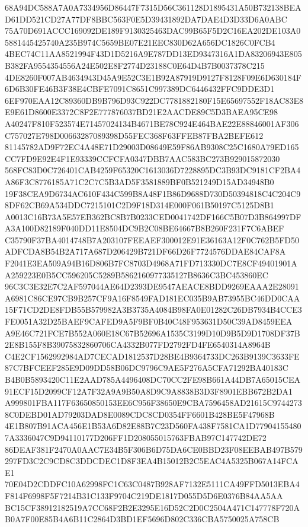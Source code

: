 \documentclass[UTF8,fontset=fandol,zihao=-4,a4paper]{ctexart}
\begin{document}
{{68A94DC588A7A0A7334956D86447F7315D56C361128D1895431A50B732138BEAD61DD521CD27A77DF8BBC563F0E5D39431892DA7DAE4D3D33D6A0ABC
75A70D691ACCC169092DE189F9130325463DAC99B65F5D2C16EA202DE103A05881445425740A235B974C5659BE07E21EEC830D62A656DC1826C0FCB4
4BEC74C11AA8521994F43D1D5216A9E787DD13ED9347316A1DA83206943E805B382FA9554354556A24E502E8F2774D23188C0E64D4B7B0037378C215
4DE8260F007AB4634943D45A9E52C3E1B92A87919D9127F8128F09E6D630184F6D6B30FE46B3F38E4CBFE7091C8651C997389DC6446432FFC9DDE3D1
6EF970EAA12C89360DB9B796D93C922DC7781882180F15E65697552F18AC83E8E9E61D8600E3372C8F2E777876037BD21E2AACDE89C5D3BAEA95CE98
A40247F810F523574E71457024134B4671BE78C924E464BAE22E88846001AF306C757027E798D00663287089398D55FEC368F63FFEB87FBA2BEFE612
81145782AD9F72EC4A48E71D29003D08649E59F86AB9308C25C1680A79ED165CC7FD9E92E4F1E93339CCFCFA0347DBB7AAC583BC273B929015872030
568FC83D0C726401CAB4259F65320C1613036D7228895DC3B93DC9181CF2BA4A86F3C8776185A71C2C7C5B3AD5F3581889BF0B521249D15AD34948B0
19F38CEA9D6734AC610F434C599B8A48F1B86D9688D730D50394818C4C204C98DF62CB69A534DDC7215101C2D9F18D314E000F061B50197C5125D8B1
A0013C16B73A5E57EB362BC8B7B0233CED0041742DF166C5B07D3B864997DFA3A100D82189F040DD11E8504DC9B2C08BE64667B8B260F231F7C6ABEF
C35790F37BA4014748B7A203107FEEAEF300012E91E36163A12F0C762B5FD50ADFCDA8B54B2A717A687D206429B721DF66D26F7724576DDAE84CAF8A
F2041E3EA509A94B16D806B7FC8703D4968A71FD713330DC7E8CF49401901AA259223E0B5CC596205C5289B5862160977335127B8636C3BC453860EC
96C3C3E32E7C2AF597044AE64D2393DE9547AEACE8BDD9269EAAA2E28091A6981C86CE97CB9B257CF9A16F8549FAD181EC035B9AB73955BC46DD0CAA
15F71CD2DE8FDB55B579982A3B3735A4084B98FA0E01282C26DB7934B4CCE3FE0051A32D25BAEF9CAFED9A5F9BF0B40C48F953631D50C39AD8459EEA
A9E46C721FCE7B552A060E18C67B52696A1535C3199D10D9B5D9D1708DF37B2E8B155F8B39075832860706CA4332B077FD2792FD4FE6540314A8964B
C4E2CF1562992984AD7CECAD1812537D28BE4B9364733DC263B9139C3633FE87C7BFCEEF285E9D09DD58B06DC9796C9AE5F276A5CFA71292BA40183C
B4B0B5893420C11E2AAD785A4496408DC70CC2FE98B661A44DB7A65015CEA91ECF15D2099CF12A7F32A9A9B50A8D9C9A8838B3D3F8901EBB672B2DA1
A999801FBA117F63650850153EE6C956F38650E9CBA7596458AD21615C97442738C0DEBD01AD79203DAD8E0089CDC8CD0354FF6601B428BE5F47968B
4E1B807B91ACA456E1B53A6D82E88B7C23D560FA438F7581CA1D779041554807A3336047C9D94110177D206FF1D208055015763FBAB97C147742DE72
86DEAF381F2470A0AAC7E34B5F306B6D75DA6CE0BBD23F08EEBAB497B579297FD3C2C9CD8C3DDCDEC1D8F3EA4B15012B2C5EAC4A5325B067A14FCAE1
70E04D2CDDFC10A62998FC1C63C0487B928AF7132E5111CA49FFD5013EBA4F814F6998F5F7214B31C133F9704C219DE1817D055D5D6E0376B84AA5AA
BC15CF38912182519A7CC68F2B2E3295E16D52C2D0C2504A471C147778F720AB0A7F00E85B4A6B11C2864D3BD1EF5696D802C336CBA5750025A758CB
}}
\end{document}
